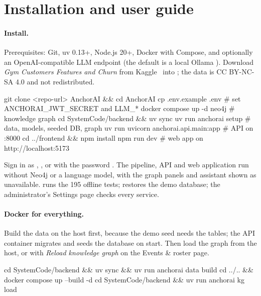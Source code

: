 \documentclass[paper=a4, fontsize=11pt, open=any, parskip=half-,
  headings=small, numbers=noenddot, captions=tableheading, toc=flat]{scrreprt}
\begin{document}
\clearpage
\section{Installation and user guide}
\label{app:install}

\paragraph{Install.} Prerequisites: Git, uv 0.13+, Node.js 20+, Docker with Compose, and optionally an OpenAI-compatible LLM endpoint (the default is a local Ollama ). Download \emph{Gym Customers Features and Churn} from Kaggle~\cite{vinueza-gym} into ; the data is CC BY-NC-SA 4.0 and not redistributed.
\begin{shell}
git clone <repo-url> AnchorAI && cd AnchorAI
cp .env.example .env                  # set ANCHORAI_JWT_SECRET and LLM_*
docker compose up -d neo4j            # knowledge graph
cd SystemCode/backend && uv sync
uv run anchorai setup                 # data, models, seeded DB, graph
uv run uvicorn anchorai.api.main:app  # API on :8000
cd ../frontend && npm install
npm run dev                           # web app on http://localhost:5173
\end{shell}
Sign in as , ,  or  with the password . The pipeline, API and web application run without Neo4j or a language model, with the graph panels and assistant shown as unavailable.  runs the 195 offline tests;  restores the demo database; the administrator's Settings page checks every service.

\paragraph{Docker for everything.} Build the data on the host first, because the demo seed needs the tables; the API container migrates and seeds the database on start. Then load the graph from the host, or with \emph{Reload knowledge graph} on the Events \& roster page.
\begin{shell}
cd SystemCode/backend && uv sync && uv run anchorai data build
cd ../.. && docker compose up --build -d
cd SystemCode/backend && uv run anchorai kg load
\end{shell}
\end{document}
